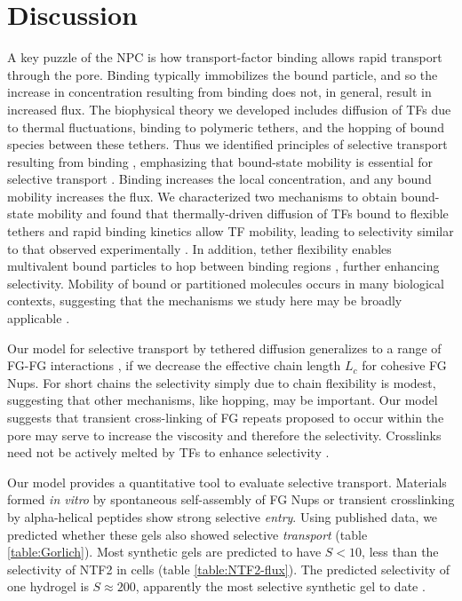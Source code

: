 \section{Discussion}
A key puzzle of the NPC is how transport-factor binding allows rapid transport through the pore.  Binding typically immobilizes the bound particle, and so the increase in concentration resulting from binding does not, in general, result in increased flux. The biophysical theory
we developed includes diffusion of TFs due to thermal fluctuations,
binding to polymeric tethers, and the hopping of bound species between
these tethers.  Thus we identified principles of selective transport
resulting from binding , emphasizing that
bound-state mobility is essential for selective transport
.  Binding increases the local concentration,
and any bound mobility increases the flux.  We characterized two
mechanisms to obtain bound-state mobility and found that
thermally-driven diffusion of TFs bound to flexible tethers and rapid
binding kinetics \cite{hough15, milles15} allow TF mobility, leading
to selectivity similar to that observed experimentally
.  In addition, tether flexibility enables
multivalent bound particles to hop between binding regions
 \cite{lowe15, schoch12}, further enhancing
selectivity. Mobility of bound or partitioned molecules occurs in many
biological contexts, suggesting that the mechanisms we study here may
be broadly applicable \cite{stefferson17, braga07}.


Our model for selective transport by tethered diffusion generalizes to
a range of FG-FG interactions \cite{vovk16}, if we decrease the
effective chain length $L_c$ for cohesive FG Nups.  For short chains
the selectivity simply due to chain flexibility is modest, suggesting
that other mechanisms, like hopping, may be important.  Our model
suggests that transient cross-linking of FG repeats proposed to occur
within the pore may serve to increase the viscosity and therefore the
selectivity. Crosslinks need not be actively melted by TFs to enhance
selectivity .
  
Our model provides a quantitative tool to evaluate selective
transport. Materials formed \textit{in vitro} by spontaneous
self-assembly of FG Nups \cite{frey07} or transient crosslinking by
alpha-helical peptides \cite{kim15} show strong selective
\textit{entry}.  Using published data, we predicted whether these gels
also showed selective \textit{transport} (table \ref{table:Gorlich}).
Most synthetic gels are predicted to have $S<10$, less than the
selectivity of NTF2 in cells (table \ref{table:NTF2-flux}). The
predicted selectivity of one hydrogel is $S\approx200$, apparently the
most selective synthetic gel to date \cite{frey07}.


